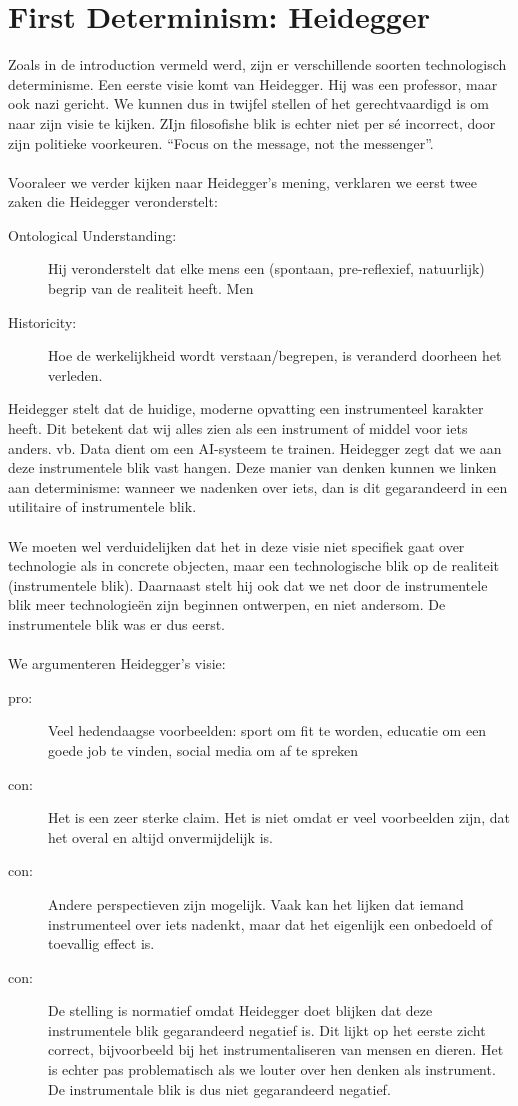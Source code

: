 \documentclass[../summary.tex]{subfiles}
\begin{document}
	\section{First Determinism: Heidegger}
	Zoals in de introduction vermeld werd, zijn er verschillende soorten technologisch determinisme. Een eerste visie komt van Heidegger. Hij was een professor, maar ook nazi gericht. We kunnen dus in twijfel stellen of het gerechtvaardigd is om naar zijn visie te kijken. ZIjn filosofishe blik is echter niet per sé incorrect, door zijn politieke voorkeuren. ``Focus on the message, not the messenger''. \\
	\\
	Vooraleer we verder kijken naar Heidegger's mening, verklaren we eerst twee zaken die Heidegger veronderstelt:
	\begin{description}
		\item[Ontological Understanding: ] Hij veronderstelt dat elke mens een (spontaan, pre-reflexief, natuurlijk) begrip van de realiteit heeft. Men
		\item[Historicity: ] Hoe de werkelijkheid wordt verstaan/begrepen, is veranderd doorheen het verleden.
	\end{description}
	Heidegger stelt dat de huidige, moderne opvatting een instrumenteel karakter heeft. Dit betekent dat wij alles zien als een instrument of middel voor iets anders. vb. Data dient om een AI-systeem te trainen. Heidegger zegt dat we aan deze instrumentele blik vast hangen. Deze manier van denken kunnen we linken aan determinisme: wanneer we nadenken over iets, dan is dit gegarandeerd in een utilitaire of instrumentele blik.\\
	\\
	We moeten wel verduidelijken dat het in deze visie niet specifiek gaat over technologie als in concrete objecten, maar een technologische blik op de realiteit (instrumentele blik). Daarnaast stelt hij ook dat we net door de instrumentele blik meer technologieën zijn beginnen ontwerpen, en niet andersom. De instrumentele blik was er dus eerst. \\
	\\
	We argumenteren Heidegger's visie:
	\begin{description}
		\item[pro:] Veel hedendaagse voorbeelden: sport om fit te worden, educatie om een goede job te vinden, social media om af te spreken
		\item[con:] Het is een zeer sterke claim. Het is niet omdat er veel voorbeelden zijn, dat het overal en altijd onvermijdelijk is.
		\item[con:] Andere perspectieven zijn mogelijk. Vaak kan het lijken dat iemand instrumenteel over iets nadenkt, maar dat het eigenlijk een onbedoeld of toevallig effect is.
		\item[con:] De stelling is normatief omdat Heidegger doet blijken dat deze instrumentele blik gegarandeerd negatief is. Dit lijkt op het eerste zicht correct, bijvoorbeeld bij het instrumentaliseren van mensen en dieren. Het is echter pas problematisch als we louter over hen denken als instrument. De instrumentale blik is dus niet gegarandeerd negatief.
	\end{description}
	
\end{document}
